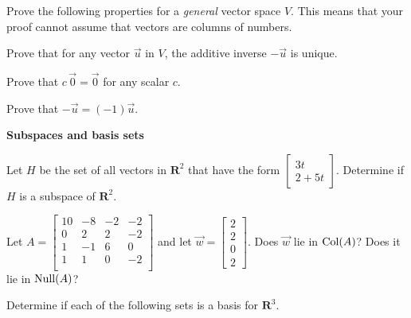 \documentclass[12pt]{exam}
\newcommand{\real}{\mathbf{R}}
\begin{document}
Prove the following properties for a \emph{general} vector space $V$.  This means that your proof cannot assume that vectors are columns of numbers.

\begin{questions}
\setcounter{question}{3}
\question
Prove that for any vector $\vec{u}$ in $V$, the additive inverse $-\vec{u}$ is unique.

\question
Prove that $c \, \vec{0} = \vec{0}$ for any scalar $c$.

\question
Prove that $- \vec{u} = (-1) \vec{u}$.

\end{questions}
\bigskip

\textbf{Subspaces and basis sets}
\smallskip

\begin{questions}
\setcounter{question}{6}

\question
Let $H$ be the set of all vectors in $\real^2$ that have the form 
$\left[ \begin{array}{c}
	3t \\ 2 + 5t
\end{array} \right]$.  Determine if $H$ is a subspace of $\real^2$.

\question
Let $A = \left[ \begin{array}{cccc}
	10 & -8 & -2 & -2 \\	
	0 & 2 & 2 & -2 \\	
	1 & -1 & 6 & 0 \\	
	1 & 1 & 0 & -2 \\	
\end{array} \right]$ and 
let $\vec{w} = \left[ \begin{array}{c}
	2 \\ 2 \\ 0 \\ 2	
\end{array} \right]$.  Does $\vec{w}$ lie in $\textnormal{Col}(A)$?  Does it lie in $\textnormal{Null}(A)$?

\clearpage

\question
Determine if each of the following sets is a basis for $\real^3$.
\begin{parts}
\part
$\left\lbrace \left[
\begin{array}{c}
1 \\ 1 \\ 0
\end{array}
\right], 
\left[
\begin{array}{c}
0 \\ 0 \\ 0
\end{array}
\right],
\left[
\begin{array}{c}
1 \\ 1 \\ 0
\end{array}
\right] \right\rbrace$


\end{parts}
\end{questions}
\end{document}
